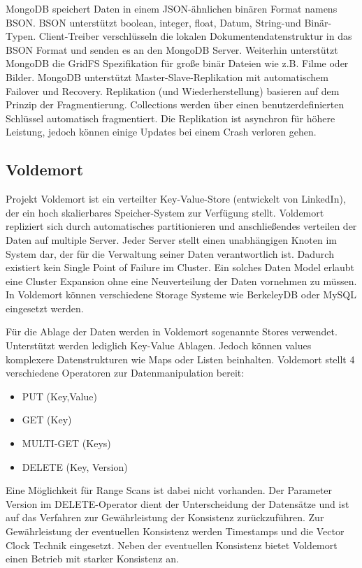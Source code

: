 MongoDB speichert Daten in einem JSON-ähnlichen binären Format namens BSON. BSON unterstützt boolean, integer, float, Datum, String-und Binär-Typen. Client-Treiber verschlüsseln die lokalen Dokumentendatenstruktur in das BSON Format und senden es an den MongoDB Server. Weiterhin unterstützt MongoDB die GridFS Spezifikation für große binär Dateien wie z.B. Filme oder Bilder. MongoDB unterstützt Master-Slave-Replikation mit automatischem Failover und Recovery. Replikation (und Wiederherstellung) basieren auf dem Prinzip der Fragmentierung. Collections werden über einen benutzerdefinierten Schlüssel automatisch fragmentiert. Die Replikation ist asynchron für höhere Leistung, jedoch können einige Updates bei einem Crash verloren gehen. 

\subsection{Voldemort}

Projekt Voldemort \cite{vod2013} ist ein verteilter Key-Value-Store (entwickelt von LinkedIn), der ein hoch skalierbares Speicher-System zur Verfügung stellt. Voldemort repliziert sich durch automatisches partitionieren und anschließendes verteilen der Daten auf multiple Server. Jeder Server stellt einen unabhängigen Knoten im System dar, der für die Verwaltung seiner Daten verantwortlich ist. Dadurch existiert kein Single Point of Failure im Cluster. Ein solches Daten Model erlaubt eine Cluster Expansion ohne eine Neuverteilung der Daten vornehmen zu müssen. In Voldemort können verschiedene Storage Systeme wie BerkeleyDB oder MySQL eingesetzt werden. 

Für die Ablage der Daten werden in Voldemort sogenannte Stores verwendet. Unterstützt werden lediglich Key-Value Ablagen. Jedoch können values komplexere Datenstrukturen wie Maps oder Listen beinhalten. Voldemort stellt 4 verschiedene Operatoren zur Datenmanipulation bereit:

\begin{itemize}

	\item PUT (Key,Value)
	\item GET (Key)
	\item MULTI-GET (Keys)
	\item DELETE (Key, Version) 

\end{itemize}

Eine Möglichkeit für Range Scans ist dabei nicht vorhanden. Der Parameter Version im DELETE-Operator dient der Unterscheidung der Datensätze und ist auf das Verfahren zur Gewährleistung der Konsistenz zurückzuführen. Zur Gewährleistung der eventuellen Konsistenz werden Timestamps und die Vector Clock Technik eingesetzt. Neben der eventuellen Konsistenz bietet Voldemort einen Betrieb mit starker Konsistenz an.       

